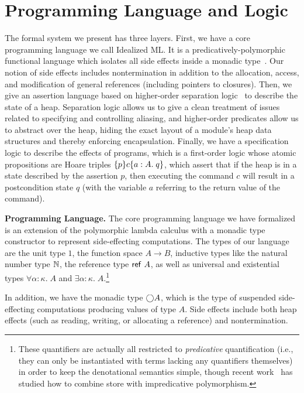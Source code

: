 \documentclass[preprint,natbib]{sigplanconf}
\begin{document}
\section{Programming Language and Logic}
\label{sec:logic}
The formal system we present has three layers. First, we have a core
programming language we call Idealized ML. It is a
predicatively-polymorphic functional language which isolates all side
effects inside a monadic type~\cite{pfenning-davies}. Our notion of
side effects includes nontermination in addition to the allocation,
access, and modification of general references (including pointers to
closures).  Then, we give an assertion language based on higher-order
separation logic~\cite{hosl} to describe the state of a
heap. Separation logic allows us to give a clean treatment of issues
related to specifying and controlling aliasing, and higher-order
predicates allow us to abstract over the heap, hiding the exact layout
of a module's heap data structures and thereby enforcing
encapsulation.  Finally, we have a specification logic to describe the
effects of programs, which is a first-order logic whose atomic
propositions are Hoare triples $\{{p}\}{c}\{{a:A}.\;{q}\}$, which assert
that if the heap is in a state described by the assertion $p$, then
executing the command $c$ will result in a postcondition state $q$
(with the variable $a$ referring to the return value of the command).


\textbf{Programming Language.} The core programming language we have
formalized is an extension of the polymorphic lambda calculus with a
monadic type constructor to represent side-effecting computations.
The types of our language are the unit type $1$, the function space $A
\to B$, inductive types like the natural number type $\mathbb{N}$, the reference type
$\mbox{\textsf{{ref }}}A$, as well as universal and existential types $\forall
\alpha:\kappa.\;A$ and $\exists \alpha:\kappa.\;A$.\footnote{These
  quantifiers are actually all restricted to \emph{predicative}
  quantification (i.e., they can only be instantiated with terms
  lacking any quantifiers themselves) in order to keep the
  denotational semantics simple, though recent
  work~\cite{birkedal-impred} has studied how to combine store with
  impredicative polymorphism.}

In addition, we have the monadic type $\bigcirc{A}$, which is the type
of suspended side-effecting computations producing values of type
$A$. Side effects include both heap effects (such as reading, writing,
or allocating a reference) and nontermination.
\end{document}
